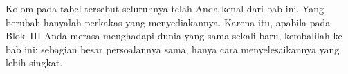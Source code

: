 \begin{catatabox}
Kolom  pada tabel tersebut seluruhnya telah
Anda kenal dari bab ini. Yang berubah hanyalah perkakas yang menyediakannya.
Karena itu, apabila pada Blok~III Anda merasa menghadapi dunia yang sama
sekali baru, kembalilah ke bab ini: sebagian besar persoalannya sama, hanya
cara menyelesaikannya yang lebih singkat.
\end{catatabox}
